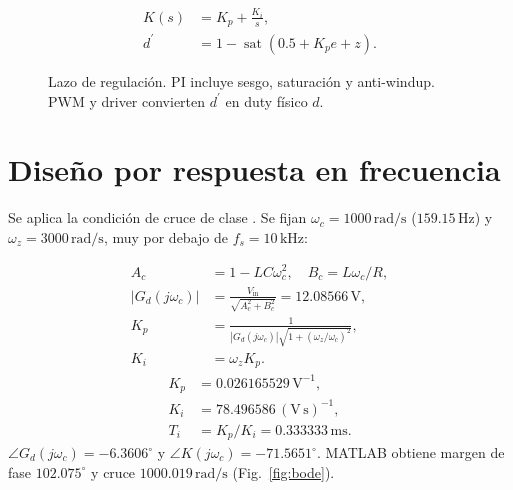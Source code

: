 \documentclass[conference,letterpaper]{IEEEtran}
\begin{document}
\begin{equation}\label{eq:controller}\begin{aligned}K(s)&=K_p+\frac{K_i}{s},\\d^{\prime}&=1-\operatorname{sat}(0.5+K_pe+z).\end{aligned}\end{equation}
\begin{figure}[H]\centering{}\caption{Lazo de regulación. PI incluye sesgo, saturación y anti-windup. PWM y driver convierten $d^{\prime}$ en duty físico $d$.}\label{fig:control}\end{figure}
\section{Diseño por respuesta en frecuencia}
Se aplica la condición de cruce de clase \cite{frequency}. Se fijan $\omega_c=1000\,\mathrm{rad/s}$ ($159.15\,\mathrm{Hz}$) y $\omega_z=3000\,\mathrm{rad/s}$, muy por debajo de $f_s=10\,\mathrm{kHz}$:

\begin{equation}\label{eq:design}\begin{aligned}A_c&=1-LC\omega_c^2,\quad B_c=L\omega_c/R,\\|G_d(j\omega_c)|&=\frac{V_{\mathrm{in}}}{\sqrt{A_c^2+B_c^2}}=12.08566\,\mathrm{V},\\K_p&=\frac{1}{|G_d(j\omega_c)|\sqrt{1+(\omega_z/\omega_c)^2}},\\K_i&=\omega_zK_p.\end{aligned}\end{equation}
\begin{equation}\label{eq:gains}\begin{aligned}K_p&=0.026165529\,\mathrm{V}^{-1},\\K_i&=78.496586\,(\mathrm{V\,s})^{-1},\\T_i&=K_p/K_i=0.333333\,\mathrm{ms}.\end{aligned}\end{equation}
$\angle G_d(j\omega_c)=-6.3606^\circ$ y $\angle K(j\omega_c)=-71.5651^\circ$. MATLAB \cite{matlab} obtiene margen de fase $102.075^\circ$ y cruce $1000.019\,\mathrm{rad/s}$ (Fig.~\ref{fig:bode}).
\end{document}
